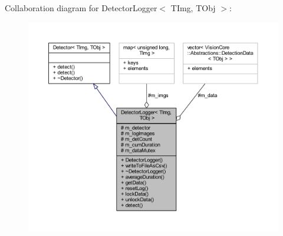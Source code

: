 Collaboration diagram for Detector\+Logger$<$ T\+Img, T\+Obj $>$\+:
\nopagebreak
\begin{figure}[H]
\begin{center}
\leavevmode
\includegraphics[width=350pt]{class_vision_core_1_1_abstractions_1_1_detector_logger__coll__graph}
\end{center}
\end{figure}
